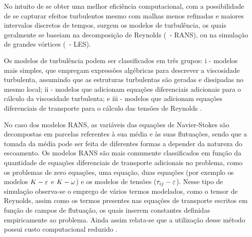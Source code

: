 

No intuito de se obter uma melhor eficiência computacional, com a possibilidade de se capturar efeitos turbulentos mesmo com malhas menos refinadas e maiores intervalos discretos de tempos, surgem os modelos de turbulência, os quais geralmente se baseiam na decomposição de Reynolds (\RANS\ - RANS), ou na simulação de grandes vórtices (\LES\ - LES).

Os modelos de turbulência podem ser classificados em três grupos: i - modelos mais simples, que empregam expressões algébricas para descrever a viscosidade turbulenta, assumindo que as estruturas turbulentas são geradas e dissipadas no mesmo local; ii - modelos que adicionam equações diferenciais adicionais para o cálculo da viscosidade turbulenta; e iii - modelos que adicionam equações diferenciais de transporte para o cálculo das tensões de Reynolds \cite{souza2011revisao,alfonsi2009reynolds,teixeira2001simulaccao}.

No caso dos modelos RANS, as variáveis das equações de Navier-Stokes são decompostas em parcelas referentes à sua média e às suas flutuações, sendo que a tomada da média pode ser feita de diferentes formas a depender da natureza do escoamento. Os modelos RANS são mais comumente classificados em função da quantidade de equações diferenciais de transporte adicionais no problema, como os problemas de zero equações, uma equação, duas equações (por exemplo os modelos $K-\varepsilon$ e $K-\omega$) e os modelos de tensões ($\tau_{ij}-\varepsilon$). Nesse tipo de simulação observa-se o emprego de vários termos modelados, como o tensor de Reynolds, assim como os termos presentes nas equações de transporte escritos em função de campos de flutuação, os quais inserem constantes definidas empiricamente ao problema. Ainda assim relata-se que a utilização desse método possui custo computacional reduzido \cite{katopodes2019free}.

